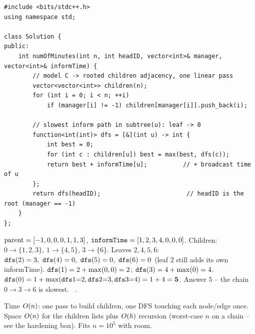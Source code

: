 \begin{lstlisting}[caption={Time Needed to Inform All Employees (LeetCode 1376)}, label={lst:c04-inform}]
#include <bits/stdc++.h>
using namespace std;

class Solution {
public:
    int numOfMinutes(int n, int headID, vector<int>& manager, vector<int>& informTime) {
        // model C -> rooted children adjacency, one linear pass
        vector<vector<int>> children(n);
        for (int i = 0; i < n; ++i)
            if (manager[i] != -1) children[manager[i]].push_back(i);

        // slowest inform path in subtree(u): leaf -> 0
        function<int(int)> dfs = [&](int u) -> int {
            int best = 0;
            for (int c : children[u]) best = max(best, dfs(c));
            return best + informTime[u];          // + broadcast time of u
        };
        return dfs(headID);                        // headID is the root (manager == -1)
    }
};
\end{lstlisting}

\begin{tracebox}[$G$ re-read as the org chart, headID $=0$]
$\operatorname{parent}=[-1,0,0,0,1,1,3]$, $\texttt{informTime}=[1,2,3,4,0,0,0]$.
Children: $0\!\to\!\{1,2,3\}$, $1\!\to\!\{4,5\}$, $3\!\to\!\{6\}$.
Leaves $2,4,5,6$: $\code{dfs}(2)=3,\ \code{dfs}(4)=0,\ \code{dfs}(5)=0,\ \code{dfs}(6)=0$
(leaf $2$ still adds its own informTime).
$\texttt{dfs}(1)=2+\max(0,0)=2$; $\texttt{dfs}(3)=4+\max(0)=4$.
$\texttt{dfs}(0)=1+\max(\texttt{dfs}1{=}2,\texttt{dfs}2{=}3,\texttt{dfs}3{=}4)=1+4=\mathbf{5}$.
Answer $5$ -- the chain $0\!\to\!3\!\to\!6$ is slowest. \checkmark\ .
\end{tracebox}

\begin{complexitybox}
Time $O(n)$: one pass to build children, one DFS touching each node/edge once. Space
$O(n)$ for the children lists plus $O(h)$ recursion (worst-case $n$ on a chain --
see the hardening box). Fits $n=10^5$ with room.
\end{complexitybox}

